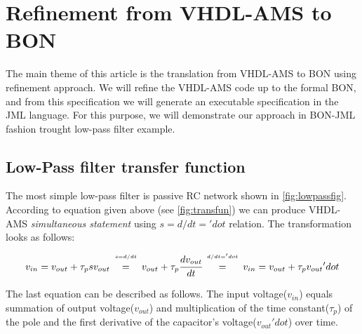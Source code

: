 \documentclass{article}
\begin{document}
\section{Refinement from VHDL-AMS to BON }
\label{sec:refVB} The main theme of this article is the translation
from VHDL-AMS to BON using refinement approach.  We will refine the
VHDL-AMS code up to the formal BON, and from this specification we
will generate an executable specification in the JML language.  For
this purpose, we will demonstrate our approach in BON-JML fashion
trought low-pass filter example.

\subsection{Low-Pass filter transfer function }
\label{subsec:lptransfunc} 
 

The most simple low-pass filter is passive RC network shown in
\autoref{fig:lowpassfig}.  According to equation given above (see
\autoref{fig:transfun}) we can produce VHDL-AMS \emph{simultaneous
  statement} using \texttt{$s = d/dt = 'dot$} relation.  The
transformation looks as follows:
\begin{equation}
v_{in} = v_{out} + \tau_psv_{out} 
   \begin{array}[b]{c}                                                                                                                                    
      {\scriptscriptstyle s = d/dt}  \\=                                                                                                                  
   \end{array} 
v_{out} + \tau_p\cfrac{dv_{out}}{dt}
\begin{array}[b]{c}                                                                                                                                    
      {\scriptscriptstyle d/dt = } {\scriptscriptstyle 'dot} \\=                                                                                                                  
   \end{array}
  v_{in} = v_{out} + \tau_pv_{out}{'dot} 
\end{equation} 

The last equation can be described as follows.  The input
voltage\xspace($v_{in}$)\xspace equals summation of output
voltage\xspace($v_{out}$)\xspace and multiplication of the time
constant\xspace($\tau_p$)\xspace of the pole and the first derivative
of the capacitor's voltage\xspace($v_{out}{'dot}$)\xspace over time.
\end{document}
